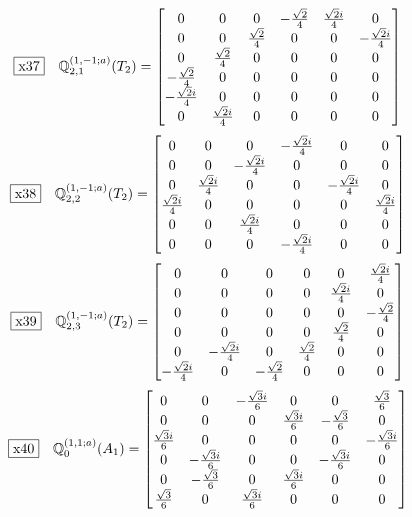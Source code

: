 \documentclass[fleqn,10pt,landscape]{jsarticle}
\begin{document}
\begin{dmath*}
\fbox{x37}\quad \mathbb{Q}_{2,1}^{(1,-1;a)}(T_{2})=\begin{bmatrix} 0 & 0 & 0 & - \frac{\sqrt{2}}{4} & \frac{\sqrt{2} i}{4} & 0 \\ 0 & 0 & \frac{\sqrt{2}}{4} & 0 & 0 & - \frac{\sqrt{2} i}{4} \\ 0 & \frac{\sqrt{2}}{4} & 0 & 0 & 0 & 0 \\ - \frac{\sqrt{2}}{4} & 0 & 0 & 0 & 0 & 0 \\ - \frac{\sqrt{2} i}{4} & 0 & 0 & 0 & 0 & 0 \\ 0 & \frac{\sqrt{2} i}{4} & 0 & 0 & 0 & 0 \end{bmatrix}
\end{dmath*}
\begin{dmath*}
\fbox{x38}\quad \mathbb{Q}_{2,2}^{(1,-1;a)}(T_{2})=\begin{bmatrix} 0 & 0 & 0 & - \frac{\sqrt{2} i}{4} & 0 & 0 \\ 0 & 0 & - \frac{\sqrt{2} i}{4} & 0 & 0 & 0 \\ 0 & \frac{\sqrt{2} i}{4} & 0 & 0 & - \frac{\sqrt{2} i}{4} & 0 \\ \frac{\sqrt{2} i}{4} & 0 & 0 & 0 & 0 & \frac{\sqrt{2} i}{4} \\ 0 & 0 & \frac{\sqrt{2} i}{4} & 0 & 0 & 0 \\ 0 & 0 & 0 & - \frac{\sqrt{2} i}{4} & 0 & 0 \end{bmatrix}
\end{dmath*}
\begin{dmath*}
\fbox{x39}\quad \mathbb{Q}_{2,3}^{(1,-1;a)}(T_{2})=\begin{bmatrix} 0 & 0 & 0 & 0 & 0 & \frac{\sqrt{2} i}{4} \\ 0 & 0 & 0 & 0 & \frac{\sqrt{2} i}{4} & 0 \\ 0 & 0 & 0 & 0 & 0 & - \frac{\sqrt{2}}{4} \\ 0 & 0 & 0 & 0 & \frac{\sqrt{2}}{4} & 0 \\ 0 & - \frac{\sqrt{2} i}{4} & 0 & \frac{\sqrt{2}}{4} & 0 & 0 \\ - \frac{\sqrt{2} i}{4} & 0 & - \frac{\sqrt{2}}{4} & 0 & 0 & 0 \end{bmatrix}
\end{dmath*}
\begin{dmath*}
\fbox{x40}\quad \mathbb{Q}_{0}^{(1,1;a)}(A_{1})=\begin{bmatrix} 0 & 0 & - \frac{\sqrt{3} i}{6} & 0 & 0 & \frac{\sqrt{3}}{6} \\ 0 & 0 & 0 & \frac{\sqrt{3} i}{6} & - \frac{\sqrt{3}}{6} & 0 \\ \frac{\sqrt{3} i}{6} & 0 & 0 & 0 & 0 & - \frac{\sqrt{3} i}{6} \\ 0 & - \frac{\sqrt{3} i}{6} & 0 & 0 & - \frac{\sqrt{3} i}{6} & 0 \\ 0 & - \frac{\sqrt{3}}{6} & 0 & \frac{\sqrt{3} i}{6} & 0 & 0 \\ \frac{\sqrt{3}}{6} & 0 & \frac{\sqrt{3} i}{6} & 0 & 0 & 0 \end{bmatrix}
\end{dmath*}
\end{document}
